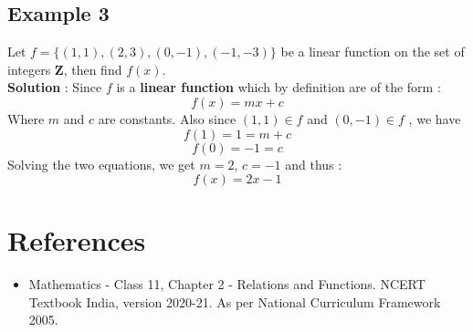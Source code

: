\documentclass[12pt, letterpaper]{article}
\begin{document}
\subsection{Example 3}
Let $f = \{(1,1), (2,3), (0,-1), (-1,-3)\}$ be a linear function on the set of integers $\mathbf{Z}$, then find $f(x)$.\\
\textbf{Solution} : Since $f$ is a \textbf{linear function} which by definition are of the form : 
\begin{displaymath}
f(x) = mx + c
\end{displaymath}
Where $m$ and $c$ are constants. Also since $(1,1) \in f$ and $(0,-1) \in f$ , we have 
\begin{displaymath}
f(1) = 1 = m + c
\end{displaymath}
\begin{displaymath}
f(0) = -1 = c
\end{displaymath}
Solving the two equations, we get $m = 2$, $c = -1$ and thus : 
\begin{displaymath}
f(x) = 2x-1
\end{displaymath}  

\section{References}
\begin{itemize}
    \item Mathematics - Class 11, Chapter 2 - Relations and Functions. NCERT Textbook India, version 2020-21. As per National Curriculum Framework 2005.
\end{itemize}
\end{document}
